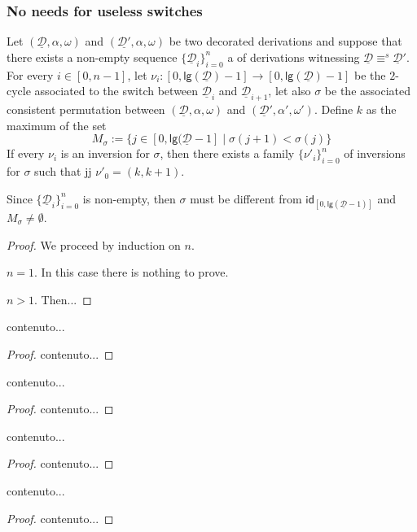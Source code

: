 \documentclass[a4paper,UKenglish,cleveref,pdftex, thm-restate,numberwithinsect]{lipics}
\newcommand{\id}[1]{\mathsf{id}_{#1}}
\newcommand{\dder}[1]{\mathscr{#1}}
\newcommand{\der}[1]{\underline{\dder{#1}}}
\newcommand{\lgh}[0]{\mathsf{lg}}
\begin{document}
{\begin{example}\label{ex:contro}
\end{example}




\subsubsection{No needs for useless switches}

\begin{lemma} Let $(\der{D}, \alpha, \omega)$ and $(\der{D'}, \alpha, \omega)$ be two decorated derivations and suppose that there exists a non-empty sequence $\{\der{D}_i\}_{i=0}^n$ a of derivations witnessing $\der{D}\equiv^s \der{D}'$. For every $i\in [0,n-1]$, let $\nu_i\colon [0, \lgh(\der{D})-1]\to [0, \lgh(\der{D})-1]$ be the $2$-cycle associated to the switch between $\der{D}_i$ and $\der{D}_{i+1}$, let also $\sigma$ be the associated consistent permutation between $(\der{D}, \alpha, \omega)$ and $(\der{D}', \alpha', \omega')$. Define $k$ as the maximum of the set
\[M_\sigma:=\{j\in [0, \lgh(\der{D}-1] \mid \sigma(j+1) < \sigma(j) \}\]
If every $\nu_i$ is an inversion for $\sigma$, then there exists a family $\{\nu'_i\}_{i=0}^n$ of inversions for $\sigma$ such that jj $\nu'_0=(k, k+1)$.
\end{lemma}
\begin{remark}
	Since $\{\der{D}_i\}_{i=0}^n$ is non-empty, then $\sigma$ must be different from $\id{[0, \lgh(\der{D}-1)]}$ and $M_{\sigma}\neq \emptyset$.
\end{remark}
\begin{proof}
	We proceed by induction on $n$.
	
	\smallskip\noindent $n=1$. In this case there is nothing to prove.
	
	\smallskip \noindent $n>1$. Then...
\end{proof}

\begin{corollary}
	contenuto...
\end{corollary}
\begin{proof}
	contenuto...
\end{proof}


\begin{corollary}
	contenuto...
\end{corollary}
\begin{proof}
	contenuto...
\end{proof}



\begin{corollary}
	contenuto...
\end{corollary}
\begin{proof}
	contenuto...
\end{proof}


\begin{corollary}
	contenuto...
\end{corollary}
\begin{proof}
	contenuto...
\end{proof}
}
\newpage
\end{document}

